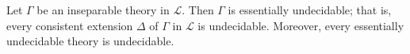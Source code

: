 Let $\Gamma$ be an inseparable theory in $\mathcal{L}$. Then $\Gamma$ is essentially undecidable; that is, every consistent extension $\Delta$ of $\Gamma$ in $\mathcal{L}$ is undecidable. Moreover, every essentially undecidable theory is undecidable.
